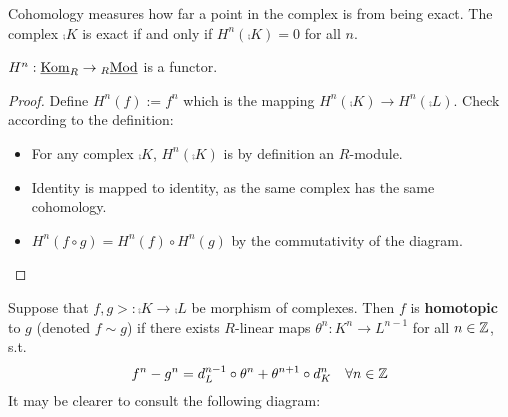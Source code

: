 \documentclass{article}
\begin{document}
\begin{remark}
    Cohomology measures how far a point in the complex is from being exact. The complex $\comp{K}$ is exact if and only if $H^n(\comp{K}) = 0$ for all $n$. 
\end{remark}

\begin{proposition}
    $H^n: \underline{\mathrm{Kom}}_R \to {}_{R}\underline{\textup{Mod}}$ is a functor.
\end{proposition}

\begin{proof}
    Define $H^n(f) := f^n$ which is the mapping $H^n(\comp{K}) \to H^n(\comp{L})$. Check according to the definition:
    \begin{itemize}
        \item For any complex $\comp{K}$, $H^n(\comp{K})$ is by definition an $R$-module. 
        \item Identity is mapped to identity, as the same complex has the same cohomology.
        \item $H^n(f \circ g) = H^n(f) \circ H^n(g)$ by the commutativity of the diagram.
    \end{itemize}
\end{proof}

\begin{definition}
    Suppose that $f, g>: \comp{K} \to \comp{L}$ be morphism of complexes. Then $f$ is \textbf{homotopic} to $g$ (denoted $f \sim g$) if there exists $R$-linear maps $\theta^n: K^n \to L^{n-1}$ for all $n \in \mathbb{Z}$, s.t. 
    \[
        f^n - g^n = d_L^{n-1} \circ \theta^n + \theta^{n+1} \circ d_K^n \quad \forall n \in \mathbb{Z}
    \]
    It may be clearer to consult the following diagram:
    \begin{figure}[htbp]
        \centering
    \end{figure}
\end{definition}
\end{document}
